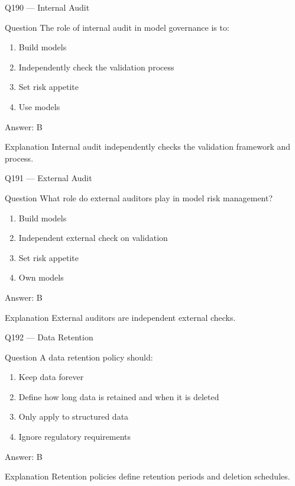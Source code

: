 \documentclass[aspectratio=169,8pt]{beamer}
\begin{document}
		\begin{frame}{Q190 --- Internal Audit}
			\begin{block}{Question}
				The role of internal audit in model governance is to:
				\begin{enumerate}
					\item Build models
					\item Independently check the validation process
					\item Set risk appetite
					\item Use models
				\end{enumerate}
			\end{block}
			\begin{exampleblock}{Answer: B}\end{exampleblock}
			\begin{block}{Explanation}
				Internal audit independently checks the validation framework and process.
			\end{block}
		\end{frame}
		
		\begin{frame}{Q191 --- External Audit}
			\begin{block}{Question}
				What role do external auditors play in model risk management?
				\begin{enumerate}
					\item Build models
					\item Independent external check on validation
					\item Set risk appetite
					\item Own models
				\end{enumerate}
			\end{block}
			\begin{exampleblock}{Answer: B}\end{exampleblock}
			\begin{block}{Explanation}
				External auditors are independent external checks.
			\end{block}
		\end{frame}
		
		\begin{frame}{Q192 --- Data Retention}
			\begin{block}{Question}
				A data retention policy should:
				\begin{enumerate}
					\item Keep data forever
					\item Define how long data is retained and when it is deleted
					\item Only apply to structured data
					\item Ignore regulatory requirements
				\end{enumerate}
			\end{block}
			\begin{exampleblock}{Answer: B}\end{exampleblock}
			\begin{block}{Explanation}
				Retention policies define retention periods and deletion schedules.
			\end{block}
		\end{frame}
		
\end{document}

